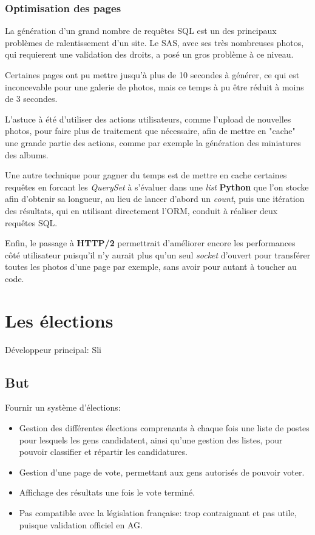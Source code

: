 \documentclass[a4paper]{report}
\begin{document}
\subsection{Optimisation des pages}
\label{sub:optimisation_des_pages}
\par La génération d'un grand nombre de requêtes SQL est un des principaux problèmes de ralentissement d'un site. Le
SAS, avec ses très nombreuses photos, qui requierent une validation des droits, a posé un gros problème à ce niveau.

\par Certaines pages ont pu mettre jusqu'à plus de 10 secondes à générer, ce qui est inconcevable pour une galerie de
photos, mais ce temps à pu être réduit à moins de 3 secondes.

\par L'astuce à été d'utiliser des actions utilisateurs, comme l'upload de nouvelles photos, pour faire plus de
traitement que nécessaire, afin de mettre en "cache" une grande partie des actions, comme par exemple la génération des
miniatures des albums.

\par Une autre technique pour gagner du temps est de mettre en cache certaines requêtes en forcant les \emph{QuerySet}
à s'évaluer dans une \emph{list} \textbf{Python} que l'on stocke afin d'obtenir sa longueur, au lieu de lancer d'abord
un \emph{count}, puis une itération des résultats, qui en utilisant directement l'ORM, conduit à réaliser deux
requêtes SQL.

\par Enfin, le passage à \textbf{HTTP/2} permettrait d'améliorer encore les performances côté utilisateur puisqu'il n'y
aurait plus qu'un seul \emph{socket} d'ouvert pour transférer toutes les photos d'une page par exemple, sans avoir
pour autant à toucher au code.


\chapter{Les élections}
\label{sec:les_elections}
\par Développeur principal: Sli

\section{But}
\label{sub:but}
\par Fournir un système d'élections:
\begin{itemize}
    \item Gestion des différentes élections comprenants à chaque fois une liste de postes pour lesquels les gens
        candidatent, ainsi qu'une gestion des listes, pour pouvoir classifier et répartir les candidatures.
    \item Gestion d'une page de vote, permettant aux gens autorisés de pouvoir voter.
    \item Affichage des résultats une fois le vote terminé.
    \item Pas compatible avec la législation française: trop contraignant et pas utile, puisque validation officiel en
        AG.
\end{itemize}
\end{document}
